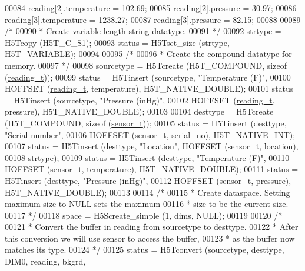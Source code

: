 \begin{DoxyCode}
00084     reading[2].temperature = 102.69;
00085     reading[2].pressure = 30.97;
00086     reading[3].temperature = 1238.27;
00087     reading[3].pressure = 82.15;
00088 
00089     \textcolor{comment}{/*}
00090 \textcolor{comment}{     * Create variable-length string datatype.}
00091 \textcolor{comment}{     */}
00092     strtype = H5Tcopy (H5T\_C\_S1);
00093     status = H5Tset\_size (strtype, H5T\_VARIABLE);
00094 
00095     \textcolor{comment}{/*}
00096 \textcolor{comment}{     * Create the compound datatype for memory.}
00097 \textcolor{comment}{     */}
00098     sourcetype = H5Tcreate (H5T\_COMPOUND, \textcolor{keyword}{sizeof} (\hyperlink{structreading__t}{reading\_t}));
00099     status = H5Tinsert (sourcetype, \textcolor{stringliteral}{"Temperature (F)"},
00100                 HOFFSET (\hyperlink{structreading__t}{reading\_t}, temperature), H5T\_NATIVE\_DOUBLE);
00101     status = H5Tinsert (sourcetype, \textcolor{stringliteral}{"Pressure (inHg)"},
00102                 HOFFSET (\hyperlink{structreading__t}{reading\_t}, pressure), H5T\_NATIVE\_DOUBLE);
00103 
00104     desttype = H5Tcreate (H5T\_COMPOUND, \textcolor{keyword}{sizeof} (\hyperlink{structsensor__t}{sensor\_t}));
00105     status = H5Tinsert (desttype, \textcolor{stringliteral}{"Serial number"},
00106                 HOFFSET (\hyperlink{structsensor__t}{sensor\_t}, serial\_no), H5T\_NATIVE\_INT);
00107     status = H5Tinsert (desttype, \textcolor{stringliteral}{"Location"}, HOFFSET (\hyperlink{structsensor__t}{sensor\_t}, location),
00108                 strtype);
00109     status = H5Tinsert (desttype, \textcolor{stringliteral}{"Temperature (F)"},
00110                 HOFFSET (\hyperlink{structsensor__t}{sensor\_t}, temperature), H5T\_NATIVE\_DOUBLE);
00111     status = H5Tinsert (desttype, \textcolor{stringliteral}{"Pressure (inHg)"},
00112                 HOFFSET (\hyperlink{structsensor__t}{sensor\_t}, pressure), H5T\_NATIVE\_DOUBLE);
00113 
00114     \textcolor{comment}{/*}
00115 \textcolor{comment}{     * Create dataspace.  Setting maximum size to NULL sets the maximum}
00116 \textcolor{comment}{     * size to be the current size.}
00117 \textcolor{comment}{     */}
00118     space = H5Screate\_simple (1, dims, NULL);
00119 
00120     \textcolor{comment}{/*}
00121 \textcolor{comment}{     * Convert the buffer in reading from sourcetype to desttype.}
00122 \textcolor{comment}{     * After this conversion we will use sensor to access the buffer,}
00123 \textcolor{comment}{     * as the buffer now matches its type.}
00124 \textcolor{comment}{     */}
00125     status = H5Tconvert (sourcetype, desttype, DIM0, reading, bkgrd,

\end{DoxyCode}

